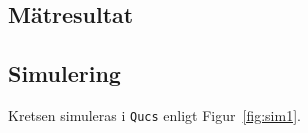 \subsection{Mätresultat}\label{}

\subsection{Simulering}\label{}




Kretsen simuleras i \texttt{Qucs} enligt Figur~\ref{fig:sim1}.

